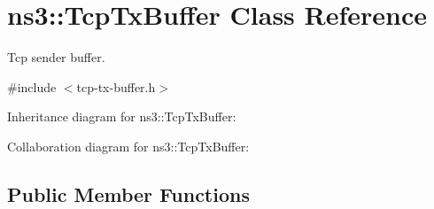 \hypertarget{classns3_1_1TcpTxBuffer}{}\section{ns3\+:\+:Tcp\+Tx\+Buffer Class Reference}
\label{classns3_1_1TcpTxBuffer}


Tcp sender buffer.  




{\ttfamily \#include $<$tcp-\/tx-\/buffer.\+h$>$}



Inheritance diagram for ns3\+:\+:Tcp\+Tx\+Buffer\+:


Collaboration diagram for ns3\+:\+:Tcp\+Tx\+Buffer\+:
\subsection*{Public Member Functions}
